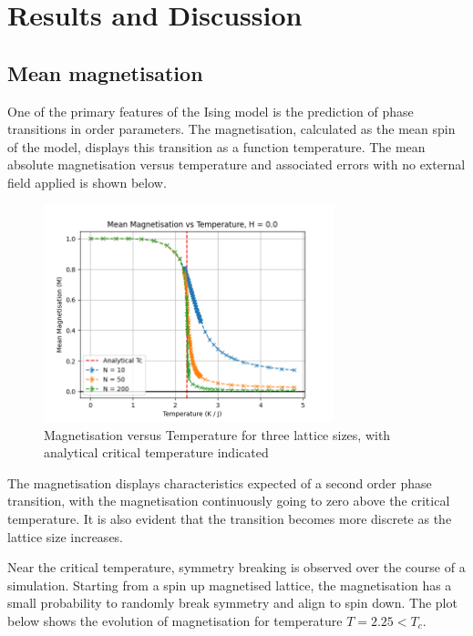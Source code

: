 \documentclass[a4paper, 12pt]{article}
\begin{document}
\newpage
\section{Results and Discussion}

\subsection{Mean magnetisation}
One of the primary features of the Ising model is the prediction of phase transitions in order parameters. The magnetisation, calculated as the mean spin of the model, displays this transition as a function temperature. The mean absolute magnetisation versus temperature and associated errors with no external field applied is shown below.

\begin{figure}[H]
\centering
\includegraphics[width=0.75\textwidth]{./resources/mag_vs_temp.png}
\caption{Magnetisation versus Temperature for three lattice sizes, with analytical critical temperature indicated}
\end{figure}

The magnetisation displays characteristics expected of a second order phase transition, with the magnetisation continuously going to zero above the critical temperature. It is also evident that the transition becomes more discrete as the lattice size increases.

Near the critical temperature, symmetry breaking is observed over the course of a simulation. Starting from a spin up magnetised lattice, the magnetisation has a small probability to randomly break symmetry and align to spin down. The plot below shows the evolution of magnetisation for temperature \( T = 2.25 < T_c \).
\end{document}
